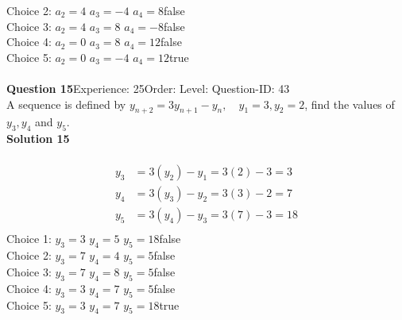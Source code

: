 \documentclass{article}
\begin{document}
Choice 2: \hspace{20pt}$a_2=4 \,\, a_3=-4 \,\, a_4=8 $\hspace{20pt}false\\
Choice 3: \hspace{20pt}$a_2=4 \,\, a_3=8 \,\, a_4=-8 $\hspace{20pt}false\\
Choice 4: \hspace{20pt}$a_2=0 \,\, a_3=8 \,\, a_4=12 $\hspace{20pt}false\\
Choice 5: \hspace{20pt}$a_2=0 \,\, a_3=-4 \,\, a_4=12 $\hspace{20pt}true\\
\\[4pt]
\noindent\textbf{Question 15}\hspace{20pt}Experience: 25\hspace{20pt}Order: \hspace{20pt}Level: \hspace{20pt}Question-ID: 43\\[2pt]
A sequence is defined by $y_{n+2}=3y_{n+1}-y_n, \quad y_1=3,y_2=2$, find the values of $y_3,y_4$ and $y_5$.\\[4pt]
\noindent\textbf{Solution 15}\\[2pt]
\\[-35pt]\begin{align*}
y_3&=3(y_2)-y_1=3(2)-3=3\\[2pt]
y_4&=3(y_3)-y_2=3(3)-2=7\\[2pt]
y_5&=3(y_4)-y_3=3(7)-3=18\\[-30pt]
\end{align*}
Choice 1: \hspace{20pt}$y_3=3 \,\, y_4=5 \,\, y_5=18 $\hspace{20pt}false\\
Choice 2: \hspace{20pt}$y_3=7 \,\, y_4=4 \,\, y_5=5 $\hspace{20pt}false\\
Choice 3: \hspace{20pt}$y_3=7 \,\, y_4=8 \,\, y_5=5 $\hspace{20pt}false\\
Choice 4: \hspace{20pt}$y_3=3 \,\, y_4=7 \,\, y_5=5 $\hspace{20pt}false\\
Choice 5: \hspace{20pt}$y_3=3 \,\, y_4=7 \,\, y_5=18 $\hspace{20pt}true\\
\end{document}
